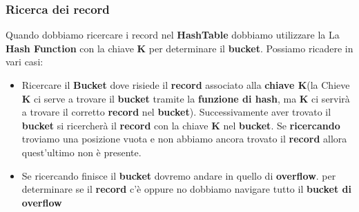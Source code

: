 \subsubsection{Ricerca dei record}
Quando dobbiamo ricercare i record nel \textbf{HashTable} dobbiamo utilizzare la La \textbf{Hash Function} con la chiave \textbf{K} per determinare il \textbf{bucket}. Possiamo ricadere in vari casi:
\begin{itemize}
    \item Ricercare il \textbf{Bucket} dove risiede il \textbf{record} associato alla \textbf{chiave K}(la Chieve \textbf{K} ci serve a trovare il \textbf{bucket} tramite la \textbf{funzione di hash}, ma \textbf{K} ci servirà a trovare il corretto \textbf{record} nel \textbf{bucket}). Successivamente aver trovato il \textbf{bucket} si ricercherà il \textbf{record} con la chiave \textbf{K} nel \textbf{bucket}. Se \textbf{ricercando} troviamo una posizione vuota e non abbiamo ancora trovato il \textbf{record} allora quest'ultimo non è presente.
    
    \item Se ricercando  finisce il \textbf{bucket} dovremo andare in quello di \textbf{overflow}. per determinare se il \textbf{record} c'è oppure no dobbiamo navigare tutto il \textbf{bucket di overflow}
\end{itemize}

